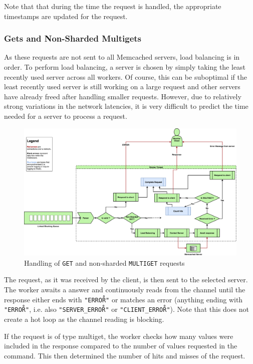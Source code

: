 \documentclass[11pt,a4paper]{article}
\begin{document}
Note that that during the time the request is handled, the appropriate timestamps are updated for the request.

\subsubsection{Gets and Non-Sharded Multigets}
As these requests are not sent to all Memcached servers, load balancing is in order. To perform load balancing, a server is chosen by simply taking the least recently used server across all workers. Of course, this can be suboptimal if the least recently used server is still working on a large request and other servers have already freed after handling smaller requests. However, due to relatively strong variations in the network latencies, it is very difficult to predict the time needed for a server to process a request.

\begin{figure}[h]
    \centering
    \includegraphics[width=\textwidth]{processing/graphics/gets_handling.png}
    \caption{Handling of \texttt{GET} and non-sharded \texttt{MULTIGET} requests}
    \label{png::gets_handling}
\end{figure}

The request, as it was received by the client, is then sent to the selected server. The worker awaits a answer and continuously reads from the channel until the response either ends with \texttt{"ERROR\r\n"} or matches an error (anything ending with \texttt{"ERROR\r\n"}, i.e. also \texttt{"SERVER_ERROR\r\n"} or \texttt{"CLIENT_ERROR\r\n"}). Note that this does not create a hot loop as the channel reading is blocking.

If the request is of type multiget, the worker checks how many values were included in the response compared to the number of values requested in the command. This then determined the number of hits and misses of the request.
\end{document}
